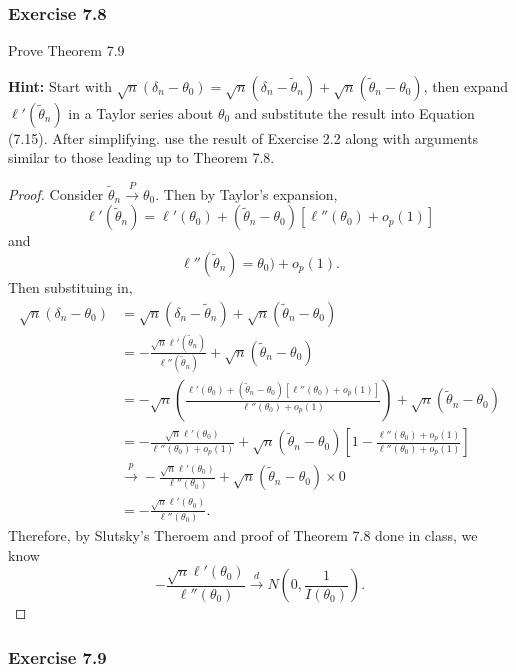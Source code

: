 \documentclass[12pt,]{article}
\begin{document}
\hypertarget{exercise-7.8}{%
\subsubsection{Exercise 7.8}\label{exercise-7.8}}

Prove Theorem 7.9

\textbf{Hint:} Start with
\(\sqrt{n}(\delta_n-\theta_0)=\sqrt{n}(\delta_n-\tilde \theta_n)+\sqrt{n}(\tilde \theta_n-\theta_0)\),
then expand \(\ell'(\tilde\theta_n)\) in a Taylor series about
\(\theta_0\) and substitute the result into Equation (7.15). After
simplifying. use the result of Exercise 2.2 along with arguments similar
to those leading up to Theorem 7.8.

\begin{proof}
Consider $\tilde\theta_n\overset{P}\rightarrow \theta_0$. Then by Taylor's expansion,
$$\ell'(\tilde\theta_n)=\ell'(\theta_0)+(\tilde\theta_n-\theta_0)[\ell''(\theta_0)+o_p(1)]$$
and
$$\ell''(\tilde\theta_n)=\theta_0)+o_p(1).$$
Then substituing in,
\begin{align*}
\sqrt{n}(\delta_n-\theta_0) & = \sqrt{n}(\delta_n-\tilde \theta_n)+\sqrt{n}(\tilde \theta_n-\theta_0)\\
& = -\frac{\sqrt{n}\ell'(\tilde\theta_n)}{\ell''(\tilde\theta_n)}+\sqrt{n}(\tilde\theta_n-\theta_0)\\
& = -\sqrt{n}\left(\frac{\ell'(\theta_0)+(\tilde\theta_n-\theta_0)[\ell''(\theta_0)+o_p(1)]}{\ell''(\theta_0)+o_p(1)}\right)+\sqrt{n}(\tilde\theta_n-\theta_0)\\
& = -\frac{\sqrt{n}\ell'(\theta_0)}{\ell''(\theta_0)+o_p(1)}+\sqrt{n}(\tilde\theta_n-\theta_0)\left[1-\frac{\ell''(\theta_0)+o_p(1)}{\ell''(\theta_0)+o_p(1)}\right]\\
&\overset{p}\rightarrow -\frac{\sqrt{n}\ell'(\theta_0)}{\ell''(\theta_0)}+\sqrt{n}(\tilde\theta_n-\theta_0)\times 0\\
&= -\frac{\sqrt{n}\ell'(\theta_0)}{\ell''(\theta_0)}.
\end{align*}
Therefore, by Slutsky's Theroem and proof of Theorem 7.8 done in class, we know
$$ -\frac{\sqrt{n}\ell'(\theta_0)}{\ell''(\theta_0)}\overset{d}\rightarrow N\left(0,\frac{1}{I(\theta_0)}\right).$$
\end{proof}

\hypertarget{exercise-7.9}{%
\subsubsection{Exercise 7.9}\label{exercise-7.9}}
\end{document}
